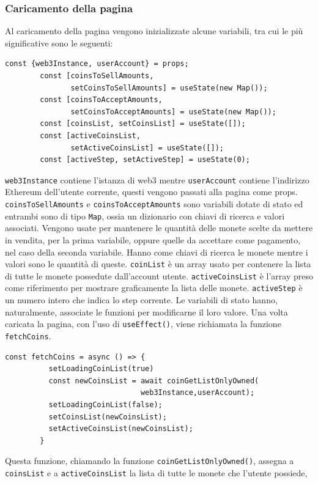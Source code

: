 \documentclass[a4paper]{article}
\begin{document}
        \subsubsection{Caricamento della pagina}
        Al caricamento della pagina vengono inizializzate alcune variabili, tra cui le più significative sono le seguenti:
        \begin{lstlisting}[style=ES6, title={Inizializzazione delle variabili al caricamento della pagina Create Sale}]
        const {web3Instance, userAccount} = props;
        const [coinsToSellAmounts,
               setCoinsToSellAmounts] = useState(new Map());
        const [coinsToAcceptAmounts,
               setCoinsToAcceptAmounts] = useState(new Map());
        const [coinsList, setCoinsList] = useState([]);
        const [activeCoinsList,
               setActiveCoinsList] = useState([]);
        const [activeStep, setActiveStep] = useState(0);\end{lstlisting}
        \verb|web3Instance| contiene l'istanza di web3 mentre \verb|userAccount| contiene l'indirizzo Ethereum dell'utente corrente, questi vengono passati alla pagina come props.
        \newline
        \verb|coinsToSellAmounts| e \verb|coinsToAcceptAmounts| sono variabili dotate di stato ed entrambi sono di tipo \verb|Map|, ossia un dizionario con chiavi di ricerca e valori associati.
        Vengono usate per mantenere le quantità delle monete scelte da mettere in vendita, per la prima variabile, oppure quelle da accettare come pagamento, nel caso della seconda variabile.
        Hanno come chiavi di ricerca le monete mentre i valori sono le quantità di queste.
        \newline
        \verb|coinList| è un array usato per contenere la lista di tutte le monete possedute dall'account utente.
        \newline
        \verb|activeCoinsList| è l'array preso come riferimento per mostrare graficamente la lista delle monete.
        \newline
        \verb|activeStep| è un numero intero che indica lo step corrente.
        \newline
        Le variabili di stato hanno, naturalmente, associate le funzioni per modificarne il loro valore.
        \newline
        Una volta caricata la pagina, con l'uso di \verb|useEffect()|, viene richiamata la funzione \verb|fetchCoins|.
        \begin{lstlisting}[style=ES6, title={Funzione fetchCoins}]
        const fetchCoins = async () => {
          setLoadingCoinList(true)
          const newCoinsList = await coinGetListOnlyOwned(
                               web3Instance,userAccount);
          setLoadingCoinList(false);
          setCoinsList(newCoinsList);
          setActiveCoinsList(newCoinsList);
        }\end{lstlisting}
        Questa funzione, chiamando la funzione \verb|coinGetListOnlyOwned()|, assegna a \verb|coinsList| e a \verb|activeCoinsList| la lista di tutte le monete che l'utente possiede,
\end{document}
